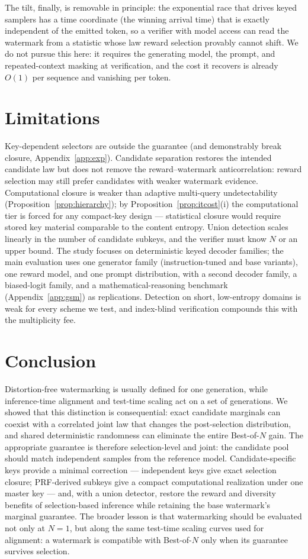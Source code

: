\documentclass{article} %
\begin{document}
The tilt, finally, is removable in principle: the exponential race that
drives keyed samplers has a time coordinate (the winning arrival time) that
is exactly independent of the emitted token, so a verifier with model access
can read the watermark from a statistic whose law reward selection provably
cannot shift. We do not pursue this here: it requires the generating model,
the prompt, and repeated-context masking at verification, and the cost it
recovers is already $O(1)$ per sequence and vanishing per token.

\section{Limitations}
Key-dependent selectors are outside the guarantee (and demonstrably break
closure, Appendix~\ref{app:exp}). Candidate separation restores the intended
candidate law but does not remove the reward--watermark anticorrelation:
reward selection may still prefer candidates with weaker watermark evidence.
Computational closure is weaker than adaptive multi-query undetectability
(Proposition~\ref{prop:hierarchy}); by
Proposition~\ref{prop:itcost}(i) the computational tier is forced for any
compact-key design --- statistical closure would require stored key material
comparable to the content entropy. Union detection scales linearly in the
number of candidate subkeys, and the verifier must know $N$ or an upper bound.
The study focuses on deterministic keyed decoder families; the main
evaluation uses one generator family (instruction-tuned and base variants),
one reward model, and one prompt distribution, with a second decoder family,
a biased-logit family, and a mathematical-reasoning benchmark
(Appendix~\ref{app:gsm}) as replications. Detection on short, low-entropy
domains is weak for every scheme we test, and index-blind verification
compounds this with the multiplicity fee.

\section{Conclusion}
Distortion-free watermarking is usually defined for one generation, while
inference-time alignment and test-time scaling act on a set of generations. We
showed that this distinction is consequential: exact candidate marginals can
coexist with a correlated joint law that changes the post-selection
distribution, and shared deterministic randomness can eliminate the entire
Best-of-$N$ gain. The appropriate guarantee is therefore selection-level and
joint: the candidate pool should match independent samples from the reference
model. Candidate-specific keys provide a minimal correction --- independent
keys give exact selection closure; PRF-derived subkeys give a compact
computational realization under one master key --- and, with a union detector,
restore the reward and diversity benefits of selection-based inference while
retaining the base watermark's marginal guarantee. The broader lesson is that
watermarking should be evaluated not only at $N{=}1$, but along the same
test-time scaling curves used for alignment: a watermark is compatible with
Best-of-$N$ only when its guarantee survives selection.
\end{document}
